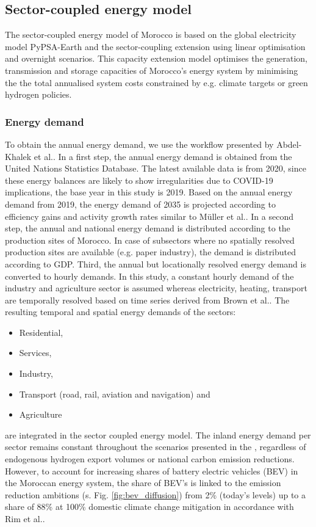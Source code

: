 
\subsection*{Sector-coupled energy model}
\label{subsec:moroccan_model}
The sector-coupled energy model of Morocco is based on the global electricity model  PyPSA-Earth \cite{Parzen2023} and the sector-coupling extension \cite{Abdel-Khalek2024} using linear optimisation and overnight scenarios. This capacity extension model optimises the generation, transmission and storage capacities of Morocco's energy system by minimising the the total annualised system costs constrained by e.g. climate targets or green hydrogen policies.

\subsubsection*{Energy demand}
To obtain the annual energy demand, we use the workflow presented by Abdel-Khalek et al.\cite{Abdel-Khalek2024}. In a first step, the annual energy demand is obtained from the United Nations Statistics Database\cite{unstats2023}. The latest available data is from 2020, since these energy balances are likely to show irregularities due to COVID-19 implications, the base year in this study is 2019. Based on the annual energy demand from 2019, the energy demand of 2035 is projected according to efficiency gains and activity growth rates similar to M{\"u}ller et al.\cite{Muller2023}.
In a second step, the annual and national energy demand is distributed according to the production sites of Morocco.
In case of subsectors where no spatially resolved production sites are available (e.g. paper industry), the demand is distributed according to GDP.
Third, the annual but locationally resolved energy demand is converted to hourly demands. In this study, a constant hourly demand of the industry and agriculture sector is assumed whereas electricity, heating, transport are temporally resolved based on time series derived from Brown et al.\cite{Brown2018a}. The resulting temporal and spatial energy demands of the sectors:
\begin{itemize}
    \item Residential,
    \item Services,
    \item Industry,
    \item Transport (road, rail, aviation and navigation) and
    \item Agriculture
\end{itemize}
are integrated in the sector coupled energy model. The inland energy demand per sector remains constant throughout the scenarios presented in the , regardless of endogenous hydrogen export volumes or national carbon emission reductions. However, to account for increasing shares of battery electric vehicles (BEV) in the Moroccan energy system, the share of BEV's is linked to the emission reduction ambitions (s. Fig. \ref{fig:bev_diffusion}) from 2\% (today's levels) up to a share of 88\% at 100\% domestic climate change mitigation in accordance with Rim et al.\cite{Rim2021}.


